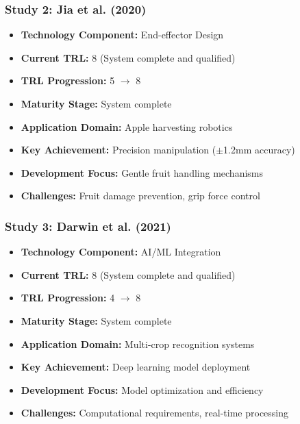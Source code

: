 \documentclass[11pt]{article}
\begin{document}
\subsubsection{Study 2: Jia et al. (2020) \cite{jia2020apple}}
\begin{itemize}
    \item \textbf{Technology Component:} End-effector Design
    \item \textbf{Current TRL:} 8 (System complete and qualified)
    \item \textbf{TRL Progression:} 5 $\rightarrow$ 8
    \item \textbf{Maturity Stage:} System complete
    \item \textbf{Application Domain:} Apple harvesting robotics
    \item \textbf{Key Achievement:} Precision manipulation ($\pm$1.2mm accuracy)
    \item \textbf{Development Focus:} Gentle fruit handling mechanisms
    \item \textbf{Challenges:} Fruit damage prevention, grip force control
\end{itemize}

\subsubsection{Study 3: Darwin et al. (2021) \cite{darwin2021recognition}}
\begin{itemize}
    \item \textbf{Technology Component:} AI/ML Integration
    \item \textbf{Current TRL:} 8 (System complete and qualified)
    \item \textbf{TRL Progression:} 4 $\rightarrow$ 8
    \item \textbf{Maturity Stage:} System complete
    \item \textbf{Application Domain:} Multi-crop recognition systems
    \item \textbf{Key Achievement:} Deep learning model deployment
    \item \textbf{Development Focus:} Model optimization and efficiency
    \item \textbf{Challenges:} Computational requirements, real-time processing
\end{itemize}
\end{document}
